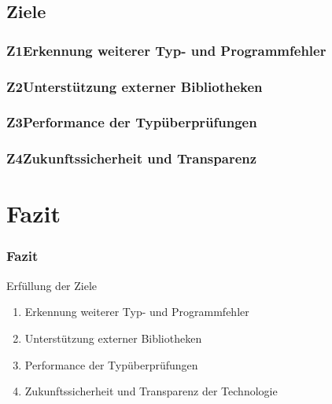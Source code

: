     \subsection{Ziele}

      \begin{frame}
        \frametitle{Z1\hspace{0.75em}Erkennung weiterer Typ- und Programmfehler}
      \end{frame}

      \begin{frame}
        \frametitle{Z2\hspace{0.75em}Unterstützung externer Bibliotheken}
      \end{frame}

      \begin{frame}
        \frametitle{Z3\hspace{0.75em}Performance der Typüberprüfungen}
      \end{frame}

      \begin{frame}
        \frametitle{Z4\hspace{0.75em}Zukunftssicherheit und Transparenz}
      \end{frame}

  \section{Fazit}

    \begin{frame}
      \frametitle{Fazit}

      \begin{block}{Erfüllung der Ziele}
        \begin{enumerate}
          \item Erkennung weiterer Typ- und Programmfehler
          \item Unterstützung externer Bibliotheken
          \item Performance der Typüberprüfungen
          \item Zukunftssicherheit und Transparenz der Technologie
        \end{enumerate}
      \end{block}
    \end{frame}

